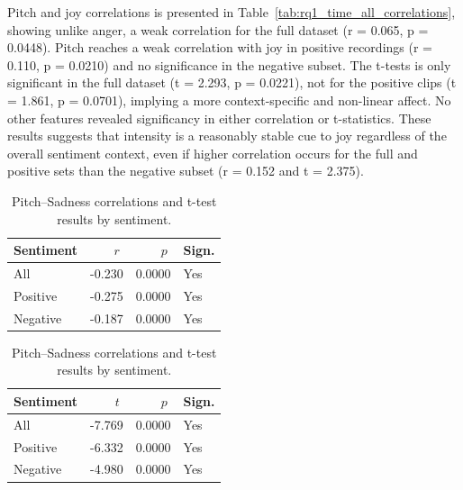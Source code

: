 Pitch and joy correlations is presented in Table~\ref{tab:rq1_time_all_correlations}, showing unlike anger, a weak correlation for the full dataset (r = 0.065, p = 0.0448). 
Pitch reaches a weak correlation with joy in positive recordings (r = 0.110, p = 0.0210) and no significance in the negative subset. 
The t-tests is only significant in the full dataset (t = 2.293, p = 0.0221), not for the positive clips (t = 1.861, p = 0.0701), implying a more context-specific and non-linear affect. No other features revealed significancy in either correlation or t-statistics. 
These results suggests that intensity is a reasonably stable cue to joy regardless of the overall sentiment context, even if higher correlation occurs for the full and positive sets than the negative subset (r = 0.152 and t = 2.375). 

\begin{table}[H]
    \centering
  
    \begin{subtable}{0.45\textwidth}
      \centering
      \caption{Pitch and Sadness (r)}\label{tab:rq1_corr_pitch_sadness}
      \begin{tabular}{l r r l}
        \toprule
        Sentiment & \(\;r\;\) & \(\;p\;\) & Sign. \\
        \midrule
        All        & -0.230        & 0.0000    & Yes         \\
        Positive   & -0.275        & 0.0000    & Yes         \\
        Negative   & -0.187        & 0.0000    & Yes         \\
        \bottomrule
      \end{tabular}
    \end{subtable}\hfill
    \begin{subtable}{0.45\textwidth}
      \centering
      \caption{Pitch and Sadness (t-test)}\label{tab:rq1_ttest_pitch_sadness}
      \begin{tabular}{l r r l}
        \toprule
        Sentiment & \(\;t\;\) & \(\;p\;\) & Sign. \\
        \midrule
        All        & -7.769       & 0.0000    & Yes         \\
        Positive   & -6.332       & 0.0000    & Yes         \\
        Negative   & -4.980       & 0.0000    & Yes         \\
        \bottomrule
      \end{tabular}
    \end{subtable}
  
    \caption{Pitch–Sadness correlations and t-test results by sentiment.}
    \label{tab:rq1_pitch_sadness_side_by_side}
  \end{table}
  
